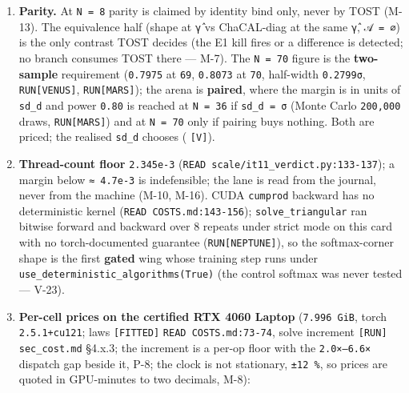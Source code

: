 \documentclass[11pt,a4paper]{article}
\theoremstyle{plain}
\theoremstyle{definition}
\theoremstyle{remark}
\begin{document}
\begin{enumerate}
  BED-S's paired sd is \texttt{NOT\ MEASURED}; the first eight seeds fix
  it and the row is filled before any prediction is scored; any contrast
  smaller than the \texttt{n\ =\ 8} cell of the \textbf{realised} sd may
  not be claimed (M-3). The MDE is in NRMSE units; the cosine and the
  \texttt{φ}-NRMSE carry their own realised sd (V-17).
\item
  \textbf{Parity.} At \texttt{N\ =\ 8} parity is claimed by identity
  bind only, never by TOST (M-13). The equivalence half (shape at
  \texttt{γ̂} vs ChaCAL-diag at the same \texttt{γ̂}, \texttt{𝒜\ =\ ∅}) is
  the only contrast TOST decides (the E1 kill fires or a difference is
  detected; no branch consumes TOST there --- M-7). The
  \texttt{N\ =\ 70} figure is the \textbf{two-sample} requirement
  (\texttt{0.7975} at \texttt{69}, \texttt{0.8073} at \texttt{70},
  half-width \texttt{0.2799σ}, \texttt{RUN{[}VENUS{]}},
  \texttt{RUN{[}MARS{]}}); the arena is \textbf{paired}, where the
  margin is in units of \texttt{sd\_d} and power \texttt{0.80} is
  reached at \texttt{N\ =\ 36} if \texttt{sd\_d\ =\ σ} (Monte Carlo
  \texttt{200,000} draws, \texttt{RUN{[}MARS{]}}) and at
  \texttt{N\ =\ 70} only if pairing buys nothing. Both are priced; the
  realised \texttt{sd\_d} chooses (\citep{schuirmann-1987-tost}
  \texttt{{[}V{]}}).
\item
  \textbf{Thread-count floor} \texttt{2.345e-3}
  (\texttt{READ\ scale/it11\_verdict.py:133-137}); a margin below
  \texttt{≈\ 4.7e-3} is indefensible; the lane is read from the journal,
  never from the machine (M-10, M-16). CUDA \texttt{cumprod} backward
  has no deterministic kernel (\texttt{READ\ COSTS.md:143-156});
  \texttt{solve\_triangular} ran bitwise forward and backward over 8
  repeats under strict mode on this card with no torch-documented
  guarantee (\texttt{RUN{[}NEPTUNE{]}}), so the softmax-corner shape is
  the first \textbf{gated} wing whose training step runs under
  \texttt{use\_deterministic\_algorithms(True)} (the control softmax was
  never tested --- V-23).
\item
  \textbf{Per-cell prices on the certified RTX 4060 Laptop}
  (\texttt{7.996\ GiB}, torch \texttt{2.5.1+cu121}; laws
  \texttt{{[}FITTED{]}} \texttt{READ\ COSTS.md:73-74}, solve increment
  \texttt{{[}RUN{]}} \texttt{sec\_cost.md} §4.x.3; the increment is a
  per-op floor with the \texttt{2.0×–6.6×} dispatch gap beside it, P-8;
  the clock is not stationary, \texttt{±12\ \%}, so prices are quoted in
  GPU-minutes to two decimals, M-8):


\end{enumerate}
\end{document}
